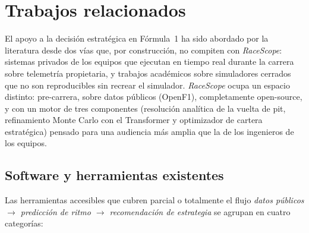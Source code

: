 \section{Trabajos relacionados}
\label{sec:trabajos_relacionados}

El apoyo a la decisión estratégica en Fórmula~1 ha sido abordado por la literatura desde dos vías que, por construcción, no compiten con \textit{RaceScope}: sistemas privados de los equipos que ejecutan en tiempo real durante la carrera sobre telemetría propietaria, y trabajos académicos sobre simuladores cerrados que no son reproducibles sin recrear el simulador. \textit{RaceScope} ocupa un espacio distinto: pre-carrera, sobre datos públicos (OpenF1), completamente open-source, y con un motor de tres componentes (resolución analítica de la vuelta de pit, refinamiento Monte Carlo con el Transformer y optimizador de cartera estratégica) pensado para una audiencia más amplia que la de los ingenieros de los equipos.

\subsection{Software y herramientas existentes}
\label{subsec:herramientas_existentes}

Las herramientas accesibles que cubren parcial o totalmente el flujo \textit{datos públicos $\to$ predicción de ritmo $\to$ recomendación de estrategia} se agrupan en cuatro categorías:

